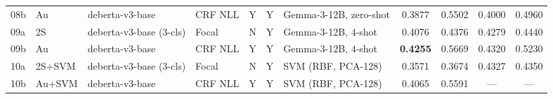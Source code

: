 \documentclass[journal]{IEEEtran}
\begin{document}
\begin{table}[!t]
\begin{tabular}{l l l l c c l c c c c}
08b & Au   & deberta-v3-base           & CRF NLL     & Y & Y & Gemma-3-12B, zero-shot       & 0.3877 & 0.5502 & 0.4000 & 0.4960 \\
09a & 2S   & deberta-v3-base (3-cls)   & Focal       & N & Y & Gemma-3-12B, $4$-shot        & 0.4076 & 0.4376 & 0.4279 & 0.4440 \\
09b & Au   & deberta-v3-base           & CRF NLL     & Y & Y & Gemma-3-12B, $4$-shot        & \textbf{0.4255} & 0.5669 & 0.4320 & 0.5230 \\
\hline
10a & 2S+SVM & deberta-v3-base (3-cls) & Focal       & N & Y & SVM (RBF, PCA-128)          & 0.3571 & 0.3674 & 0.4327 & 0.4350 \\
10b & Au+SVM & deberta-v3-base         & CRF NLL     & Y & Y & SVM (RBF, PCA-128)          & 0.4065 & 0.5591 & ---    & ---    \\
\hline
\end{tabular}
\end{table}


%
%

\end{document}
